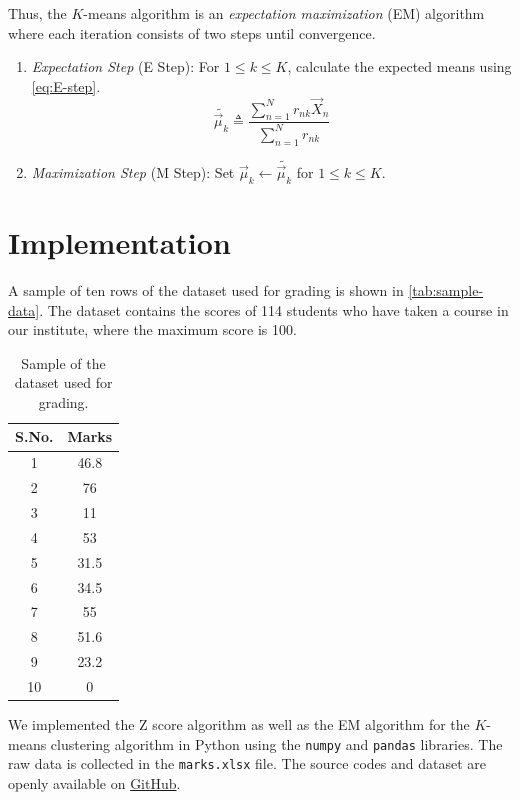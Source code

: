 \documentclass[conference]{IEEEtran}
\begin{document}
Thus, the $K$-means algorithm is an \emph{expectation maximization} (EM)
algorithm where each iteration consists of two steps until convergence.
\begin{enumerate}
    \item \emph{Expectation Step} (E Step): For $1 \le k \le K$, calculate the
    expected means using \eqref{eq:E-step}.
    \begin{equation}
        \tilde{\vec{\mu}_k} \triangleq \frac{\sum_{n=1}^Nr_{nk}\vec{X}_n}{\sum_{n=1}^Nr_{nk}}
        \label{eq:E-step}
    \end{equation}
    \item \emph{Maximization Step} (M Step): Set $\vec{\mu}_k \leftarrow
    \tilde{\vec{\mu}_k}$ for $1 \le k \le K$.
\end{enumerate}

\section{Implementation}
\label{sec:implementation}

A sample of ten rows of the dataset used for grading is shown in
\autoref{tab:sample-data}. The dataset contains the scores of 114 students who
have taken a course in our institute, where the maximum score is 100.
\begin{table}[!ht]
    \centering
    \begin{tabular}{|c|c|}
        \hline
        \textbf{S.No.} & \textbf{Marks} \\
        \hline
        1 & 46.8 \\
        \hline
        2 & 76 \\
        \hline
        3 & 11 \\
        \hline
        4 & 53 \\
        \hline
        5 & 31.5 \\
        \hline
        6 & 34.5 \\
        \hline
        7 & 55 \\
        \hline
        8 & 51.6 \\
        \hline
        9 & 23.2 \\
        \hline
        10 & 0 \\
        \hline
    \end{tabular}
    \caption{Sample of the dataset used for grading.}
    \label{tab:sample-data}
\end{table}

We implemented the Z score algorithm as well as the EM algorithm for the
$K$-means clustering algorithm in Python using the \texttt{numpy} and
\texttt{pandas} libraries. The raw data is collected in the \texttt{marks.xlsx}
file. The source codes and dataset are openly available on
\href{https://github.com/gadepall/grading/tree/main/codes}{GitHub}.
\end{document}
